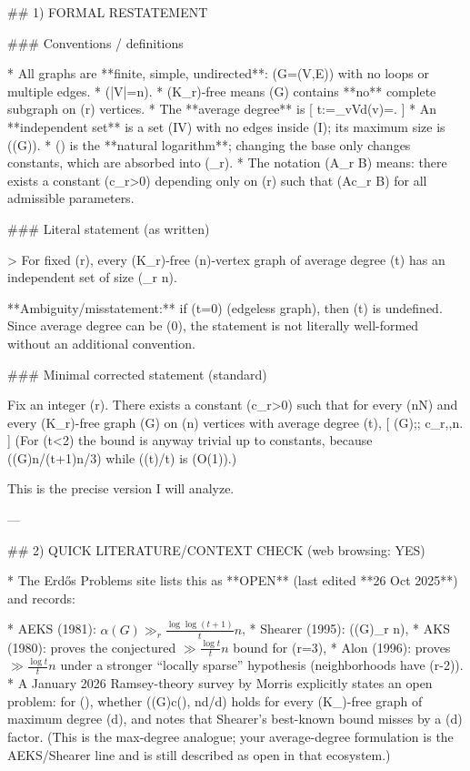 ## 1) FORMAL RESTATEMENT

### Conventions / definitions

* All graphs are **finite, simple, undirected**: (G=(V,E)) with no loops or multiple edges.
* (|V|=n).
* (K_r)-free means (G) contains **no** complete subgraph on (r) vertices.
* The **average degree** is
  [
  t:=\sum_{v\in V}d(v)=.
  ]
* An **independent set** is a set (I\subseteq V) with no edges inside (I); its maximum size is (\alpha(G)).
* (\log) is the **natural logarithm**; changing the base only changes constants, which are absorbed into (\gg_r).
* The notation (A\gg_r B) means: there exists a constant (c_r>0) depending only on (r) such that (A\ge c_r B) for all admissible parameters.

### Literal statement (as written)

> For fixed (r), every (K_r)-free (n)-vertex graph of average degree (t) has an independent set of size (\gg_r n).

**Ambiguity/misstatement:** if (t=0) (edgeless graph), then (\log t) is undefined. Since average degree can be (0), the statement is not literally well-formed without an additional convention.

### Minimal corrected statement (standard)

Fix an integer (r).
There exists a constant (c_r>0) such that for every (n\in\mathbb N) and every (K_r)-free graph (G) on (n) vertices with average degree (t),
[
\alpha(G);\ge; c_r,,n.
]
(For (t<2) the bound is anyway trivial up to constants, because (\alpha(G)\ge n/(t+1)\ge n/3) while ((\log t)/t) is (O(1)).)

This is the precise version I will analyze.

---

## 2) QUICK LITERATURE/CONTEXT CHECK (web browsing: YES)

* The Erdős Problems site lists this as **OPEN** (last edited **26 Oct 2025**) and records:

  * AEKS (1981): \(\alpha(G)\gg_r \frac{\log\log(t+1)}{t}n\),
  * Shearer (1995): (\alpha(G)\gg_r n),
  * AKS (1980): proves the conjectured \(\gg \frac{\log t}{t}n\) bound for (r=3),
  * Alon (1996): proves \(\gg \frac{\log t}{t}n\) under a stronger “locally sparse” hypothesis (neighborhoods have (\chi\le r-2)).
* A January 2026 Ramsey-theory survey by Morris explicitly states an open problem: for (\ell{}), whether (\alpha(G)\ge c(\ell), n\log d/d) holds for every (K_\ell)-free graph of maximum degree (d), and notes that Shearer’s best-known bound misses by a (\log\log d) factor.
  (This is the max-degree analogue; your average-degree formulation is the AEKS/Shearer line and is still described as open in that ecosystem.)

